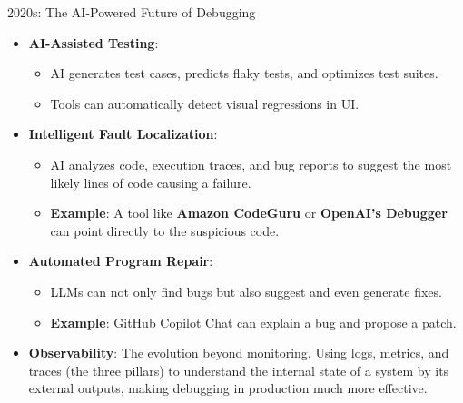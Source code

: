 \documentclass{beamer}
\begin{document}
\begin{frame}[t]{2020s: The AI-Powered Future of Debugging}
\begin{itemize}
    \item \textbf{AI-Assisted Testing}:
    \begin{itemize}
        \item AI generates test cases, predicts flaky tests, and optimizes test suites.
        \item Tools can automatically detect visual regressions in UI.
    \end{itemize}
    \item \textbf{Intelligent Fault Localization}:
    \begin{itemize}
        \item AI analyzes code, execution traces, and bug reports to suggest the most likely lines of code causing a failure.
        \item \textbf{Example}: A tool like \textbf{Amazon CodeGuru} or \textbf{OpenAI's Debugger} can point directly to the suspicious code.
    \end{itemize}
    \item \textbf{Automated Program Repair}:
    \begin{itemize}
        \item LLMs can not only find bugs but also suggest and even generate fixes.
        \item \textbf{Example}: GitHub Copilot Chat can explain a bug and propose a patch.
    \end{itemize}
    \item \textbf{Observability}: The evolution beyond monitoring. Using logs, metrics, and traces (the three pillars) to understand the internal state of a system by its external outputs, making debugging in production much more effective.
\end{itemize}
\end{frame}
\end{document}
